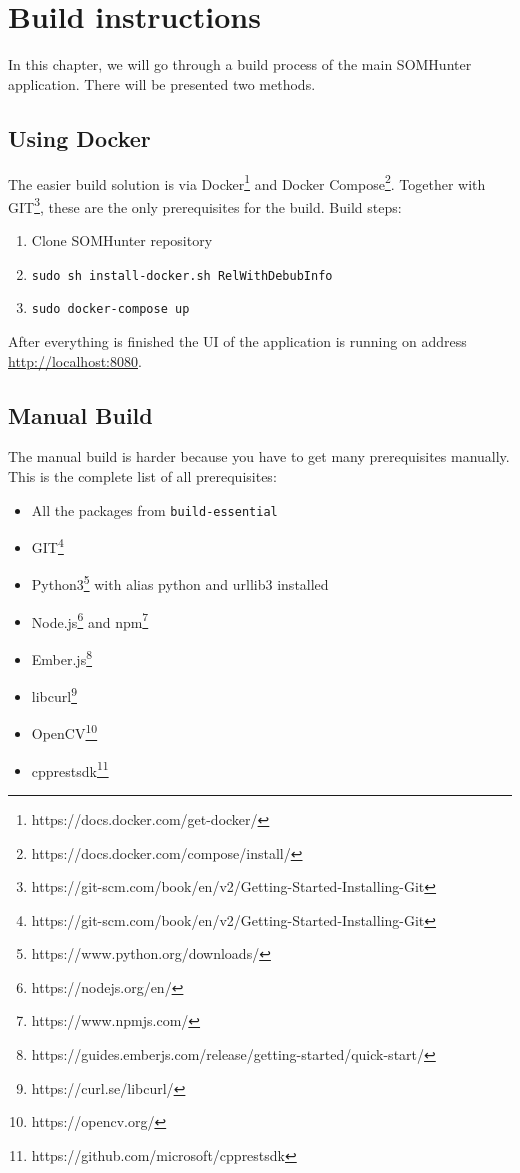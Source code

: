 \chapter{Build instructions}
\label{build}

In this chapter, we will go through a build process of the main SOMHunter application. There will be presented two methods.

\section{Using Docker}

The easier build solution is via Docker\footnote{https://docs.docker.com/get-docker/} and Docker Compose\footnote{https://docs.docker.com/compose/install/}. Together with GIT\footnote{https://git-scm.com/book/en/v2/Getting-Started-Installing-Git}, these are the only prerequisites for the build. Build steps:

\begin{enumerate}
  \item Clone SOMHunter repository
  \item \lstinline{sudo sh install-docker.sh RelWithDebubInfo}
  \item \lstinline{sudo docker-compose up}
\end{enumerate}

After everything is finished the UI of the application is running on address \url{http://localhost:8080}.

\section{Manual Build}

The manual build is harder because you have to get many prerequisites manually. This is the complete list of all prerequisites:

\begin{itemize}
  \item All the packages from \lstinline{build-essential}
  \item GIT\footnote{https://git-scm.com/book/en/v2/Getting-Started-Installing-Git}
  \item Python3\footnote{https://www.python.org/downloads/} with alias python and urllib3 installed
  \item Node.js\footnote{https://nodejs.org/en/} and npm\footnote{https://www.npmjs.com/}
  \item Ember.js\footnote{https://guides.emberjs.com/release/getting-started/quick-start/}
  \item libcurl\footnote{https://curl.se/libcurl/}
  \item OpenCV\footnote{https://opencv.org/}
  \item cpprestsdk\footnote{https://github.com/microsoft/cpprestsdk}
\end{itemize}

